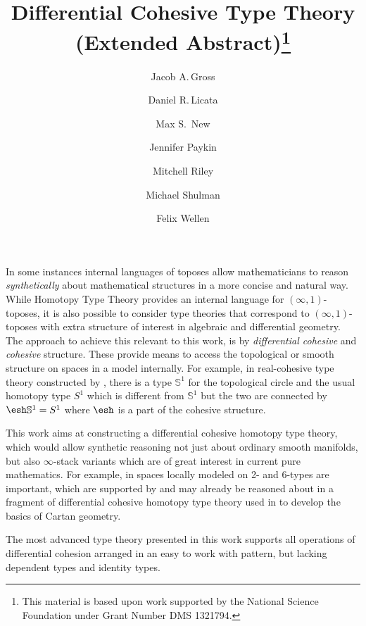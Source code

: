 \documentclass{article}
\title{Differential Cohesive Type Theory (Extended Abstract)\thanks{This
    material is based upon work supported by the National Science Foundation
    under Grant Number DMS 1321794.}}
\author{Jacob A.\,Gross}
\affil[1]{University of Pittsburgh}
\author[2]{Daniel R.\,Licata}
\affil[2]{Wesleyan University}
\author[3]{Max S.\, New}
\affil[3]{Northeastern University}
\author[4]{Jennifer Paykin}
\affil[4]{University of Pennsylvania}
\author[2]{Mitchell Riley}
\author[5]{Michael Shulman}
\affil[5]{University of San Diego}
\author[6]{Felix Wellen}
\affil[6]{Karlsruhe Institute of Technology}
\date{}
\begin{document}
\maketitle


In some instances internal languages of toposes allow mathematicians to reason
\emph{synthetically} about mathematical structures in a more concise and natural way. 
While Homotopy Type Theory provides an internal language for $(\infty,1)$-toposes, 
it is also possible to consider type theories that correspond to $(\infty,1)$-toposes with extra
structure of interest in algebraic and differential geometry.
The approach to achieve this relevant to this work, is by \emph{differential cohesive} and \emph{cohesive} structure.
These provide means to access the topological or smooth structure on spaces in a model internally.
For example, in real-cohesive type theory constructed by \citet{Shulman2015}, there is a type $\mathbb S^1$ for the topological circle 
and the usual homotopy type $S^1$ which is different from $\mathbb S^1$ but the two are connected by $\shape\mathbb S^1=S^1$ 
where $\shape$ is a part of the cohesive structure.

This work aims at constructing a differential cohesive homotopy type theory, 
which would allow synthetic reasoning not just about ordinary smooth manifolds,
but also $\infty$-stack variants which are of great interest in current pure mathematics.
For example, in \cite{SatiSchreiberStasheff2012} spaces locally modeled on 2- and 6-types are important, 
which are supported by and may already be reasoned about in a fragment of 
differential cohesive homotopy type theory used in \cite{Wellen2017} to develop the basics of Cartan geometry.

The most advanced type theory presented in this work supports all operations of differential cohesion 
arranged in an easy to work with pattern,
but lacking dependent types and identity types.
\end{document}
